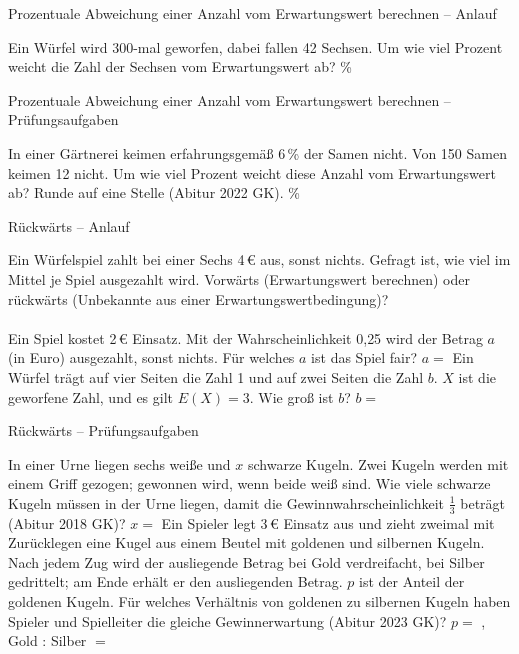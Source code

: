 \begin{aufgabe}{Prozentuale Abweichung einer Anzahl vom Erwartungswert berechnen – Anlauf}
\begin{teile}
\teil Ein Würfel wird 300-mal geworfen, dabei fallen 42 Sechsen. Um wie viel Prozent weicht die Zahl der Sechsen vom Erwartungswert ab? \leerfeld \%
\end{teile}
\end{aufgabe}

\begin{aufgabe}{Prozentuale Abweichung einer Anzahl vom Erwartungswert berechnen – Prüfungsaufgaben}
\begin{teile}
\teil In einer Gärtnerei keimen erfahrungsgemäß 6\,\% der Samen nicht. Von 150 Samen keimen 12 nicht. Um wie viel Prozent weicht diese Anzahl vom Erwartungswert ab? Runde auf eine Stelle \hfill (Abitur 2022 GK). \leerfeld \%
\end{teile}
\end{aufgabe}

\begin{aufgabe}{Rückwärts – Anlauf}
\begin{teile}
\teil Ein Würfelspiel zahlt bei einer Sechs 4\,€ aus, sonst nichts. Gefragt ist, wie viel im Mittel je Spiel ausgezahlt wird. Vorwärts (Erwartungswert berechnen) oder rückwärts (Unbekannte aus einer Erwartungswertbedingung)? \\  \\ 
\teil Ein Spiel kostet 2\,€ Einsatz. Mit der Wahrscheinlichkeit 0{,}25 wird der Betrag $a$ (in Euro) ausgezahlt, sonst nichts. Für welches $a$ ist das Spiel fair? $a = $ \leerfeld[€]
\teil Ein Würfel trägt auf vier Seiten die Zahl 1 und auf zwei Seiten die Zahl $b$. $X$ ist die geworfene Zahl, und es gilt $E(X) = 3$. Wie groß ist $b$? $b = $ \leerfeld
\end{teile}
\end{aufgabe}

\begin{aufgabe}{Rückwärts – Prüfungsaufgaben}
\begin{teile}
\teil In einer Urne liegen sechs weiße und $x$ schwarze Kugeln. Zwei Kugeln werden mit einem Griff gezogen; gewonnen wird, wenn beide weiß sind. Wie viele schwarze Kugeln müssen in der Urne liegen, damit die Gewinnwahrscheinlichkeit $\frac{1}{3}$ beträgt \hfill (Abitur 2018 GK)? $x = $ \leerfeld
\teil Ein Spieler legt 3\,€ Einsatz aus und zieht zweimal mit Zurücklegen eine Kugel aus einem Beutel mit goldenen und silbernen Kugeln. Nach jedem Zug wird der ausliegende Betrag bei Gold verdreifacht, bei Silber gedrittelt; am Ende erhält er den ausliegenden Betrag. $p$ ist der Anteil der goldenen Kugeln. Für welches Verhältnis von goldenen zu silbernen Kugeln haben Spieler und Spielleiter die gleiche Gewinnerwartung \hfill (Abitur 2023 GK)? $p = $ \leerfeld , Gold : Silber $= $ \leerfeld
\end{teile}
\end{aufgabe}

